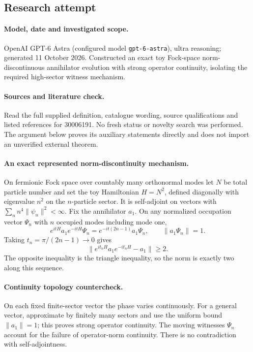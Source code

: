 \documentclass[11pt]{article}
\begin{document}
\subsection{Research attempt}
\paragraph{Model, date and investigated scope.}
OpenAI GPT-6 Astra (configured model \texttt{gpt-6-astra}), ultra reasoning; generated 11 October 2026. Constructed an exact toy Fock-space norm-discontinuous annihilator evolution with strong operator continuity, isolating the required high-sector witness mechanism.

\paragraph{Sources and literature check.}
Read the full supplied definition, catalogue wording, source qualifications and listed references for 30006191. No fresh status or novelty search was performed. The argument below proves its auxiliary statements directly and does not import an unverified external theorem.

\paragraph{An exact represented norm-discontinuity mechanism.} On fermionic Fock space over countably many orthonormal modes let \(N\) be total particle number and set the toy Hamiltonian \(H=N^2\), defined diagonally with eigenvalue \(n^2\) on the \(n\)-particle sector. It is self-adjoint on vectors with \(\sum_n n^4\|\psi_n\|^2<\infty\). Fix the annihilator \(a_1\). On any normalized occupation vector \(\Psi_n\) with \(n\) occupied modes including mode one,
\[
 e^{itH}a_1e^{-itH}\Psi_n
 =e^{-it(2n-1)}a_1\Psi_n,
 \qquad\|a_1\Psi_n\|=1.
\]
Taking \(t_n=\pi/(2n-1)\to0\) gives
\[
 \|e^{it_nH}a_1e^{-it_nH}-a_1\|\geq2.
\]
The opposite inequality is the triangle inequality, so the norm is exactly two along this sequence.
\paragraph{Continuity topology countercheck.} On each fixed finite-sector vector the phase varies continuously. For a general vector, approximate by finitely many sectors and use the uniform bound \(\|a_1\|=1\); this proves strong operator continuity. The moving witnesses \(\Psi_n\) account for the failure of operator-norm continuity. There is no contradiction with self-adjointness.
\end{document}
